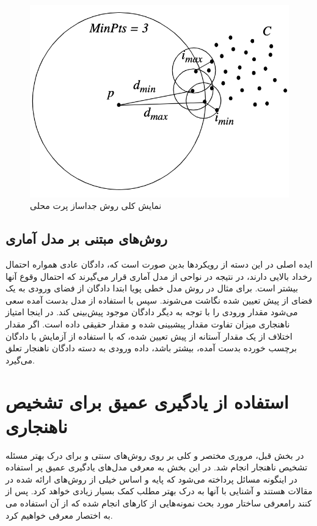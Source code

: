 \documentclass[12pt,a4paper]{report}
\begin{document}
	\begin{figure}[!h]
	\begin{center}
		\includegraphics[width=0.5\linewidth]{./images/figures/lof.png}
	\end{center}
	\caption{نمایش کلی روش جداساز پرت محلی~\cite{10.1145/342009.335388}}
	\label{fig:lof}
	\centering
\end{figure}



\subsection{روش‌های مبتنی بر مدل آماری}
ایده اصلی در این دسته از رویکرد‌ها بدین صورت است که، دادگان عادی همواره احتمال رخداد بالایی دارند، در نتیجه در نواحی از مدل آماری قرار می‌گیرند که احتمال وقوع آنها بیشتر است. برای مثال در روش مدل خطی پویا ابتدا دادگان از فضای ورودی به یک فضای از پیش تعیین شده نگاشت می‌شوند. سپس با استفاده از مدل بدست آمده سعی می‌شود مقدار ورودی را با توجه به دیگر دادگان موجود پیش‌بینی کند. در اینجا امتیاز ناهنجاری میزان تفاوت مقدار پیشبینی شده و مقدار حقیقی داده است. اگر مقدار اختلاف از یک مقدار آستانه از پیش تعیین شده، که با استفاده از آزمایش با دادگان برچسب خورده بدست آمده، بیشتر باشد، داده ورودی به دسته دادگان ناهنجار تعلق می‌گیرد.


\section{استفاده از یادگیری عمیق برای تشخیص ناهنجاری}
 در بخش قبل، مروری مختصر و کلی بر روی روش‌های سنتی و برای درک بهتر مسئله تشخیص ناهنجار انجام شد. در این بخش به معرفی مدل‌های یادگیری عمیق پر استفاده در اینگونه مسائل پرداخته می‌شود که پایه و اساس خیلی از روش‌های ارائه شده در مقالات هستند و آشنایی با آنها به درک بهتر مطلب کمک بسیار زیادی خواهد کرد. پس از معرفی ساختار مورد بحث نمونه‌هایی از کار‌های انجام شده که از آن استفاده می‌‎کنند را به اختصار معرفی خواهیم کرد.
\end{document}
